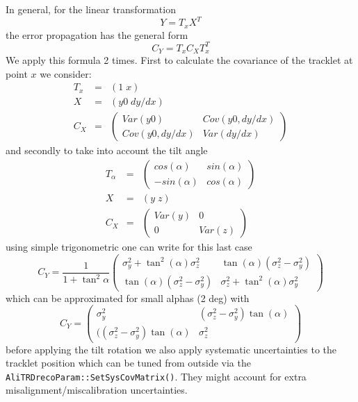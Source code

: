 \documentclass{alicetdr}
\begin{document}
In general, for the linear transformation
\begin{equation}
Y = T_{x} X^{T}
\end{equation}
the error propagation has the general form
\begin{equation}
C_{Y} = T_{x} C_{X} T_{x}^{T}
\end{equation}
We apply this formula 2 times. First to calculate the covariance of the tracklet
at point $x$ we consider:
\begin{eqnarray}
T_{x} &=& (1\; x)\\
X&=&(y0\; dy/dx)\\
C_{X}&=&
  \left( \begin{array}{cc}
    Var(y0) & Cov(y0, dy/dx)\\
    Cov(y0, dy/dx) & Var(dy/dx)
  \end{array} \right)
\end{eqnarray}
and secondly to take into account the tilt angle
\begin{eqnarray}
T_{\alpha}& = &
  \left( \begin{array}{cc}
    cos(\alpha)&sin(\alpha)\\
    -sin(\alpha)& cos(\alpha)
  \end{array} \right)\\
X&=&(y\; z)\\
C_{X}&=&
  \left( \begin{array}{cc}
    Var(y) &0\\
    0 &Var(z)
  \end{array} \right)
\end{eqnarray}
using simple trigonometric one can write for this last case
\begin{equation}
C_{Y}=\frac{1}{1+\tan^{2}\alpha}
  \left( \begin{array}{cc}
    \sigma_{y}^{2}+\tan^{2}(\alpha)\sigma_{z}^{2} &
    \tan(\alpha)(\sigma_{z}^{2}-\sigma_{y}^{2})\\
    \tan(\alpha)(\sigma_{z}^{2}-\sigma_{y}^{2}) &
    \sigma_{z}^{2}+\tan^{2}(\alpha)\sigma_{y}^{2}
  \end{array} \right)
\end{equation}
which can be approximated for small alphas (2 deg) with
\begin{equation}
C_{Y}=
  \left( \begin{array}{cc}
    \sigma_{y}^{2} & (\sigma_{z}^{2}-\sigma_{y}^{2})\tan(\alpha)\\
    ((\sigma_{z}^{2}-\sigma_{y}^{2})\tan(\alpha) & \sigma_{z}^{2}
  \end{array} \right)
\end{equation}
before applying the tilt rotation we also apply systematic uncertainties
to the tracklet position which can be tuned from outside via the
{\tt AliTRDrecoParam::SetSysCovMatrix()}. They might account for extra
misalignment/miscalibration uncertainties.
\end{document}
